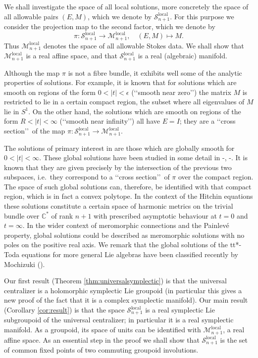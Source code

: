 \documentclass[a4paper,12pt,leqno]{amsart}
\numberwithin{equation}{section}
\theoremstyle{plain}
\theoremstyle{definition}
\newcommand{\C}{\mathbb C}
\newcommand{\cS}{\mathcal{S}}
\newcommand{\cM}{\mathcal{M}}
\renewcommand{\ll}{\lq\lq}
\newcommand{\rr}{\rq\rq\ }
\newcommand{\rrr}{\rq\rq}
\begin{document}
We shall investigate the space of all local solutions, more concretely the space of all allowable pairs $(E,M)$, which we denote by
$\cS_{n+1}^{\text{local}}$.  For this purpose we consider the projection map to the second factor, which we denote by
\[
\pi: \cS_{n+1}^{\text{local}}\to \cM_{n+1}^{\text{local}},\quad (E,M) \mapsto M.
\]
Thus $\cM_{n+1}^{\text{local}}$ denotes the space of all allowable Stokes data.
We shall show that $\cM_{n+1}^{\text{local}}$ is a real affine space, and that
$\cS_{n+1}^{\text{local}}$ is a real (algebraic) manifold.

Although the map $\pi$ is not a fibre bundle, it exhibits well some of the analytic properties of solutions.
For example, it is known that for solutions which are smooth on regions of the form $0<\vert t\vert<\epsilon$ (\ll smooth near zero\rrr) the matrix $M$ is restricted to lie in a certain compact region, the subset where all eigenvalues of $M$ lie in $S^1$.
On the other hand, the solutions which are smooth on regions of the form $R<\vert t\vert<\infty$ (\ll smooth near infinity\rrr) all have $E=I$; they are a \ll cross section\rr of the map
$\pi: \cS_{n+1}^{\text{local}}\to \cM_{n+1}^{\text{local}}$.


The solutions of primary interest in \cite{CeVa91} are those which are globally smooth for $0<\vert t\vert<\infty$.  These global solutions have been studied in some detail in
\cite{GIL1}-\cite{GuLi14}, \cite{MoXX}-\cite{Mo14}. It is known that they are given precisely by the intersection of the previous two subspaces, i.e.\ they correspond to a \ll cross section\rr of $\pi$ over the compact region.
The space of such global solutions can, therefore,  be identified with that compact region,
which is in fact a convex polytope.
In the context of the
Hitchin equations these solutions constitute a certain space of harmonic metrics on the trivial bundle over $\C^\ast$ of rank $n+1$ with prescribed asymptotic behaviour at $t=0$ and $t=\infty$.
In the wider context of meromorphic connections and the Painlev\'e property, global solutions could be described as
meromorphic solutions with no poles on the positive real axis. We remark that the global solutions of the tt*-Toda equations for more general Lie algebras have been classified recently by Mochizuki (\cite{MoYY}).

Our first result (Theorem \ref{thm:universalsymplectic})
is that the universal centralizer is a holomorphic symplectic Lie groupoid (in particular this gives a new proof of the fact that it is a complex symplectic manifold).
Our main result (Corollary \ref{cor:result}) is that the space $\cS_{n+1}^{\text{local}}$ is
a real symplectic Lie subgroupoid of the universal centralizer; in particular it is a real
symplectic manifold. As a groupoid,
its space of units can be identified with
$\cM_{n+1}^{\text{local}}$, a real affine space.
As an essential step in the proof we shall show
that $\cS_{n+1}^{\text{local}}$ is the
set of common fixed points of two commuting groupoid involutions.
\end{document}
